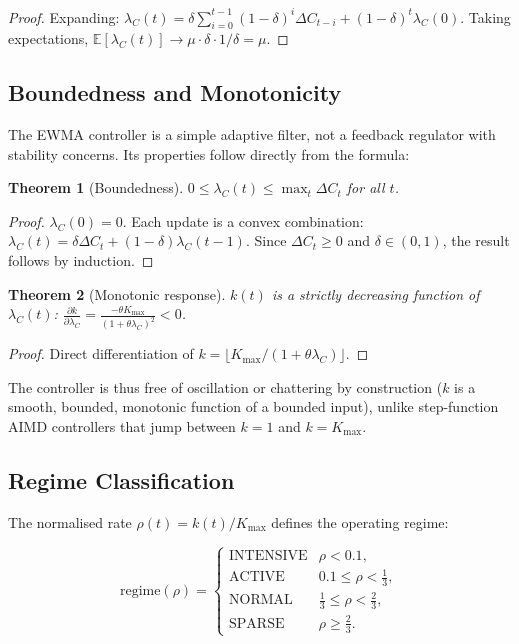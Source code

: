 \documentclass[11pt,a4paper]{article}
\newtheorem{theorem}{Theorem}
\begin{document}
\begin{proof}
Expanding: $\lambda_C(t) = \delta \sum_{i=0}^{t-1} (1-\delta)^i \Delta C_{t-i}
+ (1-\delta)^t \lambda_C(0)$. Taking expectations,
$\mathbb{E}[\lambda_C(t)] \to \mu \cdot \delta \cdot 1/\delta = \mu$.
\end{proof}

\subsection{Boundedness and Monotonicity}

The EWMA controller is a simple adaptive filter, not a feedback regulator
with stability concerns. Its properties follow directly from the formula:

\begin{theorem}[Boundedness]
$0 \leq \lambda_C(t) \leq \max_t \Delta C_t$ for all $t$.
\end{theorem}

\begin{proof}
$\lambda_C(0) = 0$. Each update is a convex combination:
$\lambda_C(t) = \delta \Delta C_t + (1-\delta)\lambda_C(t-1)$.
Since $\Delta C_t \geq 0$ and $\delta \in (0,1)$, the result follows by
induction.
\end{proof}

\begin{theorem}[Monotonic response]
$k(t)$ is a strictly decreasing function of $\lambda_C(t)$:
$\frac{\partial k}{\partial \lambda_C} = \frac{-\theta K_{\max}}
{(1+\theta \lambda_C)^2} < 0$.
\end{theorem}

\begin{proof}
Direct differentiation of $k = \lfloor K_{\max}/(1+\theta\lambda_C) \rfloor$.
\end{proof}

The controller is thus free of oscillation or chattering by construction
($k$ is a smooth, bounded, monotonic function of a bounded input), unlike
step-function AIMD controllers that jump between $k=1$ and $k=K_{\max}$.

\subsection{Regime Classification}

The normalised rate $\rho(t) = k(t) / K_{\max}$ defines the operating regime:

\[
\text{regime}(\rho) =
\begin{cases}
\text{INTENSIVE} & \rho < 0.1, \\[2pt]
\text{ACTIVE}    & 0.1 \leq \rho < \frac13, \\[2pt]
\text{NORMAL}    & \frac13 \leq \rho < \frac23, \\[2pt]
\text{SPARSE}    & \rho \geq \frac23.
\end{cases}
\]
\end{document}
